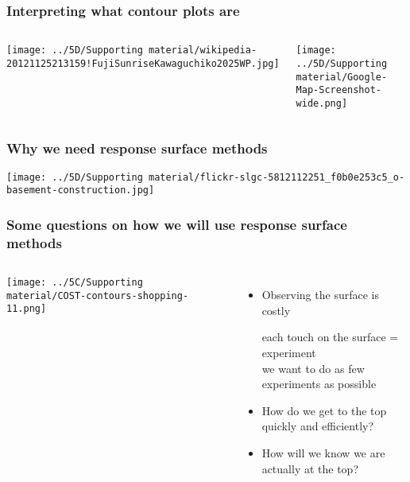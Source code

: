 
\begin{frame}\frametitle{Interpreting what contour plots are}
	\begin{columns}[b]
			\centerline{\texttt{[image: ../5D/Supporting material/wikipedia-20121125213159!FujiSunriseKawaguchiko2025WP.jpg]}}
			
		
			\centerline{\texttt{[image: ../5D/Supporting material/Google-Map-Screenshot-wide.png]}}

	\end{columns}
	
\end{frame}

\begin{frame}\frametitle{Why we need response surface methods}
	\centerline{\texttt{[image: ../5D/Supporting material/flickr-slgc-5812112251\_f0b0e253c5\_o-basement-construction.jpg]}}
\end{frame}

\begin{frame}\frametitle{Some questions on how we will use response surface methods }
	\begin{columns}[c]
			\centerline{\texttt{[image: ../5C/Supporting material/COST-contours-shopping-11.png]}}

			\begin{itemize}
				\item	Observing the surface is costly
						
						\hspace{1ex} {\scriptsize each touch on the surface = experiment }\\
						\hspace{1ex} {\scriptsize we want to do as few experiments as possible }
				\pause
				\item	How do we get to the top quickly and efficiently?
				
				\pause
				\item	How will we know we are actually at the top?
			\end{itemize}
	\end{columns}
	
\end{frame}

